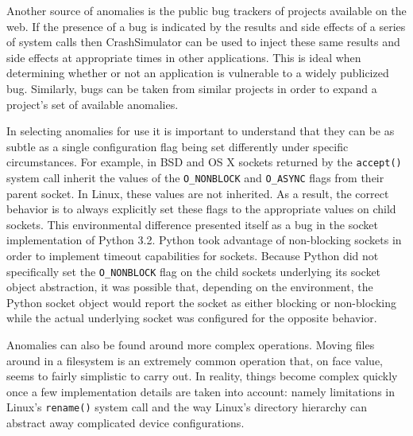 Another source of anomalies is the public bug trackers of projects
available on the web.  If the presence of a bug is indicated by the results
and side effects of a series of system calls then CrashSimulator can be
used to inject these same results and side effects at appropriate times in
other applications.  This is ideal when determining whether or not an
application is vulnerable to a widely publicized bug.  Similarly, bugs can
be taken from similar projects in order to expand a project's set of
available anomalies.

In selecting anomalies for use it is important to understand that they can
be as subtle as a single configuration flag being set differently under
specific circumstances.  For example, in BSD and OS X sockets returned by
the {\tt accept()} system call inherit the values of the {\tt O\_NONBLOCK}
and {\tt O\_ASYNC} flags from their parent socket.  In Linux, these values
are not inherited.  As a result, the correct behavior is to always
explicitly set these flags to the appropriate values on child sockets.
This environmental difference presented itself as a bug in the socket
implementation of Python 3.2.  Python took advantage of non-blocking
sockets in order to implement timeout capabilities for sockets.  Because
Python did not specifically set the {\tt O\_NONBLOCK} flag on the child
sockets underlying its socket object abstraction, it was possible that,
depending on the environment, the Python socket object would report the
socket as either blocking or non-blocking while the actual underlying
socket was configured for the opposite behavior.

Anomalies can also be found around more complex operations.  Moving files
around in a filesystem is an extremely common operation that, on face
value, seems to fairly simplistic to carry out.  In reality, things become
complex quickly once a few implementation details are taken into account:
namely limitations in Linux's {\tt rename()} system call and the way
Linux's directory hierarchy can abstract away complicated device
configurations.

